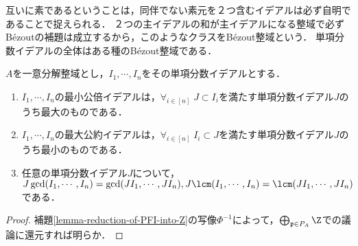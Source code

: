 \documentclass[uplatex,dvipdfmx]{jsreport}
\renewcommand{\p}{\mathfrak{p}}
\begin{document}
\begin{tcolorbox}[colframe=ForestGreen, colback=ForestGreen!10!white,breakable,colbacktitle=ForestGreen!40!white,coltitle=black,fonttitle=\bfseries\sffamily,
title=]
    互いに素であるということは，同伴でない素元を２つ含むイデアルは必ず自明であることで捉えられる．
    ２つの主イデアルの和が主イデアルになる整域で必ずBézoutの補題は成立するから，このようなクラスをBézout整域という．
    単項分数イデアルの全体はある種のBézout整域である．
\end{tcolorbox}

\begin{proposition}\label{prop-characterization-of-gcd-lcm}
    $A$を一意分解整域とし，$I_1,\cdots,I_n$をその単項分数イデアルとする．
    \begin{enumerate}
        \item $I_1,\cdots,I_n$の最小公倍イデアルは，$\forall_{i\in[n]}\;J\subset I_i$を満たす単項分数イデアル$J$のうち最大のものである．
        \item $I_1,\cdots,I_n$の最大公約イデアルは，$\forall_{i\in[n]}\;I_i\subset J$を満たす単項分数イデアル$J$のうち最小のものである．
        \item 任意の単項分数イデアル$J$について，$J\gcd(I_1,\cdots,I_n)=\gcd(JI_1,\cdots,JI_n),J\lcm(I_1,\cdots,I_n)=\lcm(JI_1,\cdots,JI_n)$である．
    \end{enumerate}
\end{proposition}
\begin{proof}
    補題\ref{lemma-reduction-of-PFI-into-Z}の写像$\Phi^{-1}$によって，$\bigoplus_{\p\in P_A}\Z$での議論に還元すれば明らか．
\end{proof}
\end{document}
